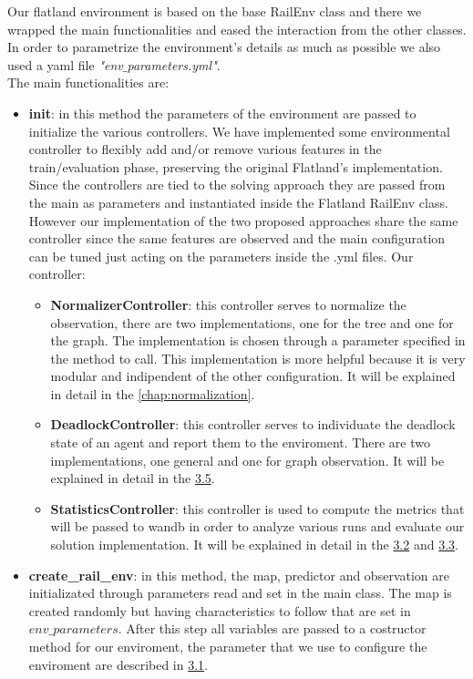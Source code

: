 Our flatland environment is based on the base RailEnv class and there we wrapped the main functionalities and eased the interaction from the other classes. In order to parametrize the environment's details as much as possible we also used a yaml file \textit{"env$\_$parameters.yml"}.\\
The main functionalities are:
\begin{itemize}
\item \textbf{init}: in this method the parameters of the environment are passed to initialize the various controllers. We have implemented some environmental controller to flexibly add and/or remove various features in the train/evaluation phase, preserving the original Flatland’s implementation. Since the controllers are tied to the solving approach they are passed from the main as parameters and instantiated inside the Flatland RailEnv class. However our implementation of the two proposed approaches share the same controller since the same features are observed and the main configuration can be tuned just acting on the parameters inside the .yml files.
Our controller:
\begin{itemize}
	\item \textbf{NormalizerController}: this controller serves to normalize the observation, there are two implementations, one for the tree and one for the graph. The implementation is chosen through a parameter specified in the method to call. This implementation is more helpful because it is very modular and indipendent of the other configuration. It will be explained in detail in the \autoref{chap:normalization}.
	\item \textbf{DeadlockController}: this controller serves to individuate the deadlock state of an agent and report them to the enviroment. There are two implementations, one general and one for graph observation. It will be explained in detail in the \hyperref[sec:deadlockController]{3.5}.
	\item \textbf{StatisticsController}: this controller is used to compute the metrics that will be passed to wandb in order to analyze various runs and evaluate our solution implementation. It will be explained in detail in the \hyperref[sec:metrics]{3.2} and \hyperref[sec:evaluation]{3.3}.
\end{itemize}
\item \textbf{create\_rail\_env}: in this method, the map, predictor and observation are initializated through parameters read and set in the main class. The map is created randomly but having characteristics to follow that are set in $env\_parameters$. After this step all variables are passed to a costructor method for our enviroment, the parameter that we use to configure the enviroment are described in \hyperref[sec:ourParameters]{3.1}.

\end{itemize}

